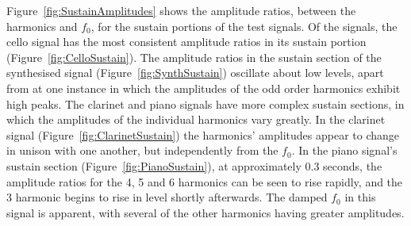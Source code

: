 			Figure~\ref{fig:SustainAmplitudes} shows the amplitude ratios, between the harmonics and $f_{0}$,
			for the sustain portions of the test signals. Of the signals, the cello signal has the most
			consistent amplitude ratios in its sustain portion (Figure~\ref{fig:CelloSustain}). The amplitude
			ratios in the sustain section of the synthesised signal (Figure~\ref{fig:SynthSustain}) oscillate
			about low levels, apart from at one instance in which the amplitudes of the odd order harmonics
			exhibit high peaks. The clarinet and piano signals have more complex sustain sections, in which the
			amplitudes of the individual harmonics vary greatly. In the clarinet signal
			(Figure~\ref{fig:ClarinetSustain}) the harmonics' amplitudes appear to change in unison with one
			another, but independently from the $f_{0}$. In the piano signal's sustain section
			(Figure~\ref{fig:PianoSustain}), at approximately 0.3 seconds, the amplitude ratios for the
			4\super{th}, 5 and 6 harmonics can be seen to rise rapidly, and the 3
			harmonic begins to rise in level shortly afterwards. The damped $f_{0}$ in this signal is apparent,
			with several of the other harmonics having greater amplitudes.

